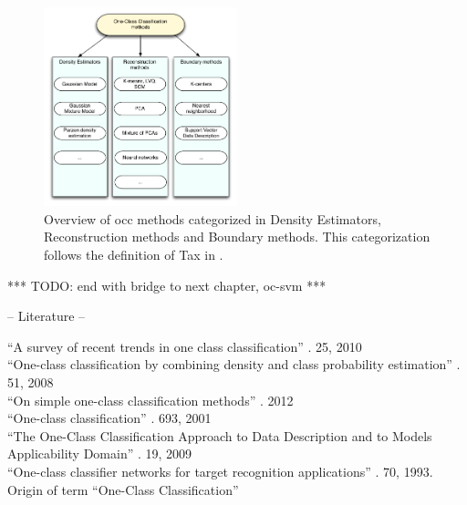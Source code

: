 \begin{figure}
  \centering
    \includegraphics[width=0.5\textwidth,keepaspectratio]{./Figures/chapter3/occ_methods.pdf}
  \caption[\gls{occ} methods]{Overview of \gls{occ} methods categorized in Density Estimators, Reconstruction methods and Boundary methods. This categorization follows the definition of Tax in \cite{tax2001one}.}
  \label{fig:occ-methods}
\end{figure}

*** TODO: end with bridge to next chapter, \gls{oc-svm} ***

-- Literature --

``A survey of recent trends in one class classification'' \cite{khan2010survey}. 25, 2010 \\

``One-class classification by combining density and class probability estimation'' \cite{hempstalk2008one}. 51, 2008 \\

``On simple one-class classification methods'' \cite{noumir2012simple}. 2012 \\

``One-class classification'' \cite{tax2001one}. 693, 2001 \\

``The One-Class Classification Approach to Data Description and to Models Applicability Domain'' \cite{baskin2010one}. 19, 2009 \\

``One-class classifier networks for target recognition applications'' \cite{moya1993one}. 70, 1993. Origin of term ``One-Class Classification'' \\